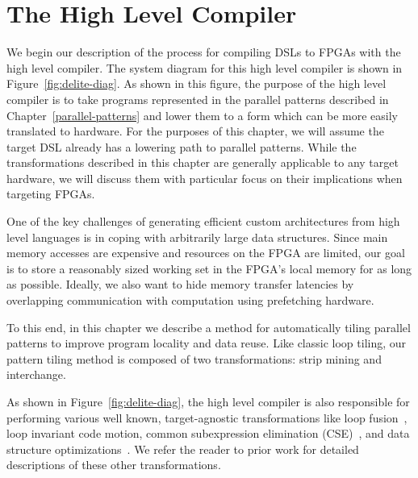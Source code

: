 \chapter{The High Level Compiler}
\label{delite}

We begin our description of the process for compiling DSLs to FPGAs with
the high level compiler. The system diagram for this high level compiler is shown in
Figure~\ref{fig:delite-diag}.
As shown in this figure, the purpose of the high level compiler is to take
programs represented in the parallel patterns described in
Chapter~\ref{parallel-patterns} and lower them to a form which can be more easily
translated to hardware. For the purposes of this chapter, we will assume the
target DSL already has a lowering path to parallel patterns. While the
transformations described in this chapter are generally applicable to any
target hardware, we will discuss them with particular focus on their implications
when targeting FPGAs.

One of the key challenges of generating efficient custom architectures from
high level languages is in coping with arbitrarily large data structures.
Since main memory accesses are expensive and resources on the FPGA are limited,
our goal is to store a reasonably sized working set in the FPGA's local memory
for as long as possible. Ideally, we also want to hide memory transfer latencies
by overlapping communication with computation using prefetching hardware.

To this end, in this chapter we describe a method for automatically tiling parallel
patterns to improve program locality and data reuse.
Like classic loop tiling, our pattern tiling method is composed of two
transformations: strip mining and interchange.

As shown in Figure~\ref{fig:delite-diag}, the high level compiler is also responsible
for performing various well known, target-agnostic transformations like
loop fusion~\cite{rompf12optimizing,damien-thesis,vera-thesis},
loop invariant code motion, common subexpression elimination (CSE)~\cite{lms},
and data structure optimizations~\cite{rompf12optimizing}.
We refer the reader to prior work for detailed descriptions of these other transformations.

